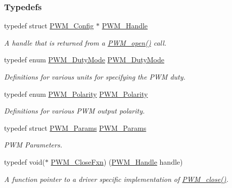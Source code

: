 \subsubsection*{Typedefs}
\begin{DoxyCompactItemize}
\item 
typedef struct \hyperlink{struct_p_w_m___config}{P\+W\+M\+\_\+\+Config} $\ast$ \hyperlink{_p_w_m_8h_afdefc765f42bbad4dca246fda6e1354b}{P\+W\+M\+\_\+\+Handle}
\begin{DoxyCompactList}\small\item\em A handle that is returned from a \hyperlink{_p_w_m_8h_ac963beab0c5c6901bf852f175028aeaf}{P\+W\+M\+\_\+open()} call. \end{DoxyCompactList}\item 
typedef enum \hyperlink{_p_w_m_8h_a6c5ba2703cb9cc02773b5073046c1607}{P\+W\+M\+\_\+\+Duty\+Mode} \hyperlink{_p_w_m_8h_a19cd06b0c3560cfdf4125d1bc70a155e}{P\+W\+M\+\_\+\+Duty\+Mode}
\begin{DoxyCompactList}\small\item\em Definitions for various units for specifying the P\+W\+M duty. \end{DoxyCompactList}\item 
typedef enum \hyperlink{_p_w_m_8h_affa60cc974f99db4aeafc9f6524ec593}{P\+W\+M\+\_\+\+Polarity} \hyperlink{_p_w_m_8h_a15b860dd4dbdba68833b71c4d9f2b929}{P\+W\+M\+\_\+\+Polarity}
\begin{DoxyCompactList}\small\item\em Definitions for various P\+W\+M output polarity. \end{DoxyCompactList}\item 
typedef struct \hyperlink{struct_p_w_m___params}{P\+W\+M\+\_\+\+Params} \hyperlink{_p_w_m_8h_ac7349e4fc779fd744daf79b403269167}{P\+W\+M\+\_\+\+Params}
\begin{DoxyCompactList}\small\item\em P\+W\+M Parameters. \end{DoxyCompactList}\item 
typedef void($\ast$ \hyperlink{_p_w_m_8h_a1643d365dfa900197b324ea74035d2ec}{P\+W\+M\+\_\+\+Close\+Fxn}) (\hyperlink{_p_w_m_8h_afdefc765f42bbad4dca246fda6e1354b}{P\+W\+M\+\_\+\+Handle} handle)
\begin{DoxyCompactList}\small\item\em A function pointer to a driver specific implementation of \hyperlink{_p_w_m_8h_a0e0f5899b067d27653db566fb148db11}{P\+W\+M\+\_\+close()}. \end{DoxyCompactList}\item 

\end{DoxyCompactItemize}
